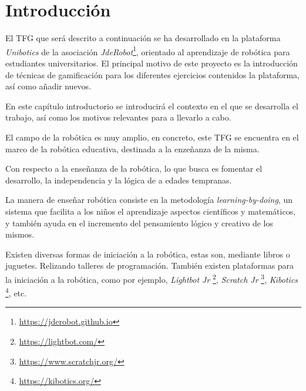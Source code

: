 \documentclass[a4paper, 12pt]{book}
\begin{document}
\tableofcontents 
\cleardoublepage
\listoffigures %



\cleardoublepage
\chapter{Introducción}
\label{sec:intro} %

El TFG que será descrito a continuación se ha desarrollado en la plataforma \textit{Unibotics} de la asociación \textit{JdeRobot}\footnote{\url{https://jderobot.github.io}}, orientado al aprendizaje de robótica para estudiantes universitarios. El principal motivo de este proyecto es la introducción de técnicas de gamificación para los diferentes ejercicios contenidos la plataforma, así como añadir nuevos.

En este capítulo introductorio se introducirá el contexto en el que se desarrolla el trabajo, así como los motivos relevantes para a llevarlo a cabo.

El campo de la robótica es muy amplio, en concreto, este TFG se encuentra en el marco de la robótica educativa, destinada a la enzeñanza de la misma.

Con respecto a la enseñanza de la robótica, lo que busca es fomentar el desarrollo, la independencia y la lógica de a edades tempranas.

La manera de enseñar robótica consiste en la metodología \emph{learning-by-doing}, un sistema que facilita a los niños el aprendizaje aspectos científicos y matemáticos, y también ayuda en el incremento del pensamiento lógico y creativo de los mismos.

Existen diversas formas de iniciación a la robótica, estas son, mediante libros o juguetes. Relizando talleres de programación. También existen plataformas para la iniciación a la robótica, como por ejemplo, \emph{Lightbot Jr} \footnote{\url{https://lightbot.com/}}, \emph{Scratch Jr} \footnote{\url{https://www.scratchjr.org/}}, \emph{Kibotics} \footnote{\url{https://kibotics.org/}}, etc.
\end{document}
